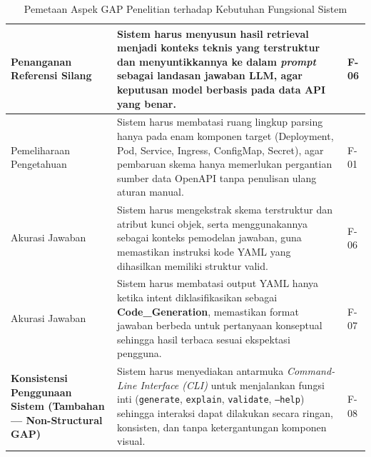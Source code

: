\begin{table}[H]
\begin{tabular}{|p{4cm}|p{7cm}|p{2cm}|}
Penanganan Referensi Silang &
Sistem harus menyusun hasil retrieval menjadi konteks teknis yang terstruktur
dan menyuntikkannya ke dalam \textit{prompt} sebagai landasan jawaban LLM,
agar keputusan model berbasis pada data API yang benar. &
F-06 \\ \hline

Pemeliharaan Pengetahuan &
Sistem harus membatasi ruang lingkup parsing hanya pada enam komponen target
(Deployment, Pod, Service, Ingress, ConfigMap, Secret),
agar pembaruan skema hanya memerlukan pergantian sumber data OpenAPI tanpa
penulisan ulang aturan manual. &
F-01 \\ \hline

Akurasi Jawaban &
Sistem harus mengekstrak skema terstruktur dan atribut kunci objek,
serta menggunakannya sebagai konteks pemodelan jawaban,
guna memastikan instruksi kode YAML yang dihasilkan memiliki struktur valid. &
F-06 \\ \hline

Akurasi Jawaban &
Sistem harus membatasi output YAML hanya ketika intent diklasifikasikan sebagai 
\textbf{Code\_Generation}, memastikan format jawaban berbeda untuk pertanyaan 
konseptual sehingga hasil terbaca sesuai ekspektasi pengguna. &
F-07 \\ \hline

\textbf{Konsistensi Penggunaan Sistem (Tambahan — Non-Structural GAP)} &
Sistem harus menyediakan antarmuka \textit{Command-Line Interface (CLI)} 
untuk menjalankan fungsi inti (\texttt{generate}, \texttt{explain},
\texttt{validate}, \texttt{--help}) sehingga interaksi dapat dilakukan secara
ringan, konsisten, dan tanpa ketergantungan komponen visual. &
F-08 \\ \hline

\end{tabular}
\caption{Pemetaan Aspek GAP Penelitian terhadap Kebutuhan Fungsional Sistem}
\label{tbl:gap_mapping_functional}
\end{table}
